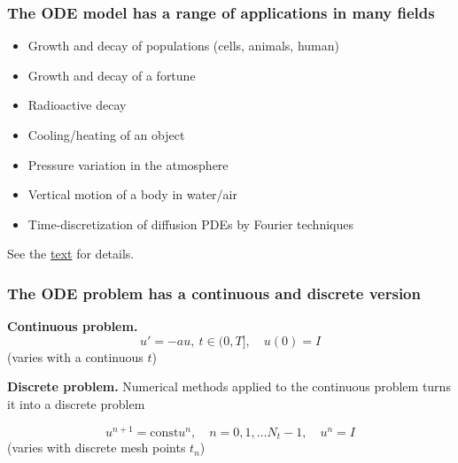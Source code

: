 \documentclass{beamer}
\begin{document}
\begin{frame}
\frametitle{The ODE model has a range of applications in many fields}

\begin{itemize}
 \item Growth and decay of populations (cells, animals, human)

 \item Growth and decay of a fortune

 \item Radioactive decay

 \item Cooling/heating of an object

 \item Pressure variation in the atmosphere

 \item Vertical motion of a body in water/air

 \item Time-discretization of diffusion PDEs by Fourier techniques
\end{itemize}

\noindent
See the \href{{http://tinyurl.com/nclmcng/pub/sphinx-decay/._main_decay008.html}}{text} for details.
\end{frame}

\begin{frame}
\frametitle{The ODE problem has a continuous and discrete version}

\noindent\textbf{Continuous problem.}
\begin{equation}
u' = -au,\ t\in (0,T], \quad u(0)=I
\label{decay:problem}
\end{equation}
(varies with a continuous $t$)

\noindent\textbf{Discrete problem.}
Numerical methods applied to the continuous problem turns it into
a discrete problem

\begin{equation}
u^{n+1} = \mbox{const} u^n, \quad n=0,1,\ldots N_t-1, \quad u^n=I
\label{decay:problem:discrete}
\end{equation}
(varies with discrete mesh points $t_n$)
\end{frame}
\end{document}
